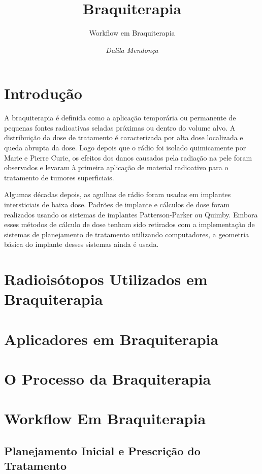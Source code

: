 \documentclass[11pt,a4paper]{article}
\title{\LobsterTwo\Huge{Braquiterapia}}
\author{\LobsterTwo\Large{Workflow em Braquiterapia}\nocite{*}}
\date{\LobsterTwo\textit{Dalila Mendonça}}
\begin{document}
	\maketitle

\section{Introdução}

	A braquiterapia é definida como a aplicação temporária ou permanente de pequenas fontes radioativas seladas próximas ou dentro do volume alvo. A distribuição da dose de tratamento é caracterizada por alta dose localizada e queda abrupta da dose. Logo depois que o rádio foi isolado quimicamente por Marie e Pierre Curie, os efeitos dos danos causados pela radiação na pele foram observados e levaram à primeira aplicação de material radioativo para o tratamento de tumores superficiais. 

	Algumas décadas depois, as agulhas de rádio foram usadas em implantes intersticiais de baixa dose. Padrões de implante e cálculos de dose foram realizados usando os sistemas de implantes Patterson-Parker ou Quimby. Embora esses métodos de cálculo de dose tenham sido retirados com a implementação de sistemas de planejamento de tratamento utilizando computadores, a geometria básica do implante desses sistemas ainda é usada.


	
\section{Radioisótopos Utilizados em Braquiterapia}

\section{Aplicadores em Braquiterapia}

\section{O Processo da Braquiterapia}

\section{Workflow Em Braquiterapia}

\subsection*{Planejamento Inicial e Prescrição do Tratamento}
\end{document}
